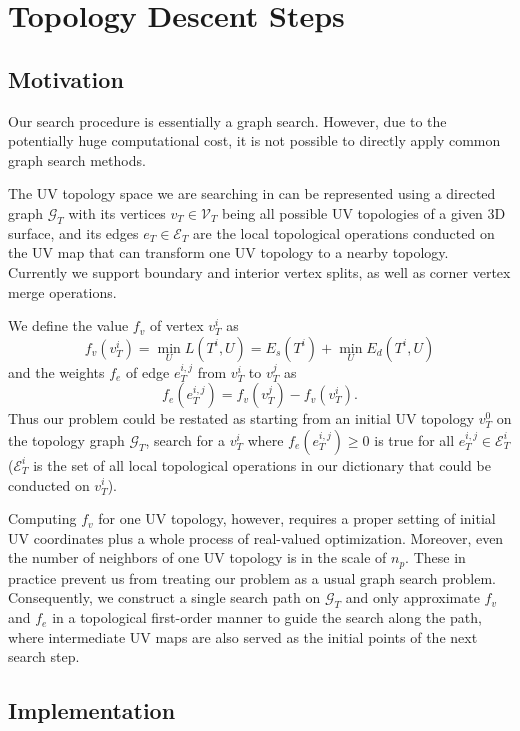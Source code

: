 
\section{Topology Descent Steps}
\label{sec:topologyStep}

\subsection{Motivation}
\label{sec:topologySearch}

Our search procedure is essentially a graph search. However, due to the potentially huge computational cost, it is not possible to directly apply common graph search methods.

The UV topology space we are searching in can be represented using a directed graph $\mathcal{G}_T$ with its vertices $v_T \in \mathcal{V}_T$ being all possible UV topologies of a given 3D surface, and its edges $e_T \in \mathcal{E}_T$ are the local topological operations conducted on the UV map that can transform one UV topology to a nearby topology. Currently we support boundary and interior vertex splits, as well as corner vertex merge operations.  

We define the value $f_v$ of vertex $v^i_T$ as 
\[ f_v(v^i_T) = \min_{U} L(T^i, U) = E_s(T^i) + \min_{U} E_d(T^i, U) \]
and the weights $f_e$ of edge $e^{i,j}_{T}$ from $v^i_T$ to $v^j_T$ as 
\[ f_e(e^{i,j}_T) = f_v(v^j_T) - f_v(v^i_T). \]
Thus our problem could be restated as starting from an initial UV topology $v^0_T$ on the topology graph $\mathcal{G}_T$, search for a $v^i_T$ where $f_e(e^{i,j}_T) \geq 0$ is true for all $e^{i,j}_T \in \mathcal{E}^i_T$ ($\mathcal{E}^i_T$ is the set of all local topological operations in our dictionary that could be conducted on $v^i_T$).

Computing $f_v$ for one UV topology, however, requires a proper setting of initial UV coordinates plus a whole process of real-valued optimization. Moreover, even the number of neighbors of one UV topology is in the scale of $n_p$. These in practice prevent us from treating our problem as a usual graph search problem. Consequently, we construct a single search path on $\mathcal{G}_T$ and only approximate $f_v$ and $f_e$ in a topological first-order manner to guide the search along the path, where intermediate UV maps are also served as the initial points of the next search step.

\subsection{Implementation}

